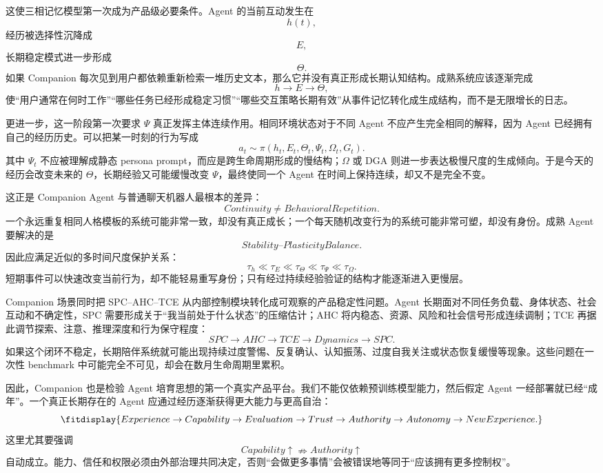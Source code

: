 这使三相记忆模型第一次成为产品级必要条件。Agent 的当前互动发生在
\[
h(t),
\]
经历被选择性沉降成
\[
E,
\]
长期稳定模式进一步形成
\[
\Theta.
\]
如果 Companion 每次见到用户都依赖重新检索一堆历史文本，那么它并没有真正形成长期认知结构。成熟系统应该逐渐完成
\[
h
\rightarrow
E
\rightarrow
\Theta,
\]
使“用户通常在何时工作”“哪些任务已经形成稳定习惯”“哪些交互策略长期有效”从事件记忆转化成生成结构，而不是无限增长的日志。

更进一步，这一阶段第一次要求 $\Psi$ 真正发挥主体连续作用。相同环境状态对于不同 Agent 不应产生完全相同的解释，因为 Agent 已经拥有自己的经历历史。可以把某一时刻的行为写成
\[
a_t
\sim
\pi(
h_t,
E_t,
\Theta_t,
\Psi_t,
\Omega_t,
G_t
).
\]
其中 $\Psi_t$ 不应被理解成静态 persona prompt，而应是跨生命周期形成的慢结构；$\Omega$ 或 DGA 则进一步表达极慢尺度的生成倾向。于是今天的经历会改变未来的 $\Theta$，长期经验又可能缓慢改变 $\Psi$，最终使同一个 Agent 在时间上保持连续，却又不是完全不变。

这正是 Companion Agent 与普通聊天机器人最根本的差异：
\[
\boxed{
Continuity
\neq
BehavioralRepetition.
}
\]
一个永远重复相同人格模板的系统可能非常一致，却没有真正成长；一个每天随机改变行为的系统可能非常可塑，却没有身份。成熟 Agent 要解决的是
\[
\boxed{
Stability\text{--}PlasticityBalance.
}
\]
因此应满足近似的多时间尺度保护关系：
\[
\tau_h
\ll
\tau_E
\ll
\tau_\Theta
\ll
\tau_\Psi
\ll
\tau_\Omega.
\]
短期事件可以快速改变当前行为，却不能轻易重写身份；只有经过持续经验验证的结构才能逐渐进入更慢层。

Companion 场景同时把 SPC--AHC--TCE 从内部控制模块转化成可观察的产品稳定性问题。Agent 长期面对不同任务负载、身体状态、社会互动和不确定性，SPC 需要形成关于“我当前处于什么状态”的压缩估计；AHC 将内稳态、资源、风险和社会信号形成连续调制；TCE 再据此调节探索、注意、推理深度和行为保守程度：
\[
SPC
\rightarrow
AHC
\rightarrow
TCE
\rightarrow
Dynamics
\rightarrow
SPC.
\]
如果这个闭环不稳定，长期陪伴系统就可能出现持续过度警惕、反复确认、认知振荡、过度自我关注或状态恢复缓慢等现象。这些问题在一次性 benchmark 中可能完全不可见，却会在数月生命周期里累积。

因此，Companion 也是检验 Agent 培育思想的第一个真实产品平台。我们不能仅依赖预训练模型能力，然后假定 Agent 一经部署就已经“成年”。一个真正长期存在的 Agent 应通过经历逐渐获得更大能力与更高自治：
\[
\fitdisplay{
Experience
\rightarrow
Capability
\rightarrow
Evaluation
\rightarrow
Trust
\rightarrow
Authority
\rightarrow
Autonomy
\rightarrow
NewExperience.
}
\]
这里尤其要强调
\[
Capability\uparrow
\nRightarrow
Authority\uparrow
\]
自动成立。能力、信任和权限必须由外部治理共同决定，否则“会做更多事情”会被错误地等同于“应该拥有更多控制权”。

